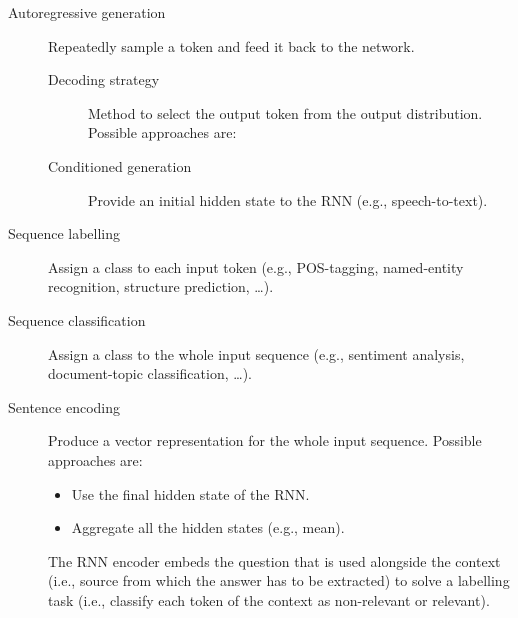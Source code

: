 \begin{description}
    \item[Autoregressive generation] 
        Repeatedly sample a token and feed it back to the network.

        \begin{description}
            \item[Decoding strategy] 
                Method to select the output token from the output distribution. Possible approaches are:
        \end{description}

        \begin{description}
            \item[Conditioned generation] 
                Provide an initial hidden state to the RNN (e.g., speech-to-text).
        \end{description}

    \item[Sequence labelling] 
        Assign a class to each input token (e.g., POS-tagging, named-entity recognition, structure prediction, \dots).

    \item[Sequence classification] 
        Assign a class to the whole input sequence (e.g., sentiment analysis, document-topic classification, \dots).

    \item[Sentence encoding] 
        Produce a vector representation for the whole input sequence.
        Possible approaches are:
        \begin{itemize}
            \item Use the final hidden state of the RNN.
            \item Aggregate all the hidden states (e.g., mean).
        \end{itemize}
    
        \begin{example}
            The RNN encoder embeds the question that is used alongside the context (i.e., source from which the answer has to be extracted) to solve a labelling task (i.e., classify each token of the context as non-relevant or relevant).
        \end{example}
\end{description}
